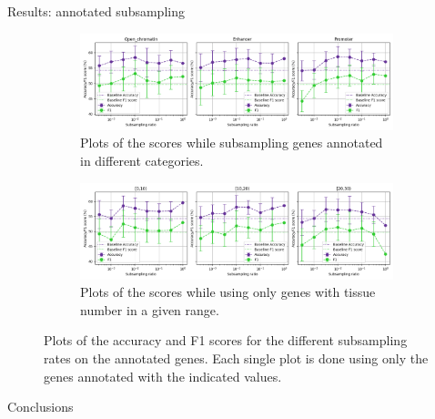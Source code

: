 \documentclass[aspectratio=169]{beamer}
\begin{document}
\begin{frame}{Results: annotated subsampling}
\begin{figure}[ht!]
\centering
\begin{subfigure}[ht]{\textwidth}
    \centering
    \includegraphics[width=\textwidth]{../figures/subsample_annotated.png}
\caption{Plots of the scores while subsampling genes annotated in different categories.}
\label{fig:res2a}
\end{subfigure}

\begin{subfigure}[ht]{\textwidth}
\centering
\includegraphics[width=\textwidth]{../figures/subsample_ntissue.png}
\caption{Plots of the scores while using only genes with tissue number in a given range.}
\label{fig:res2b}
\end{subfigure}
\caption{Plots of the accuracy and F1 scores for the different subsampling rates on the annotated genes. Each single plot is done using only the genes annotated with the indicated values.}
\label{fig:res2}
\end{figure}
\end{frame}

\begin{frame}{Conclusions}
\end{frame}
\end{document}
